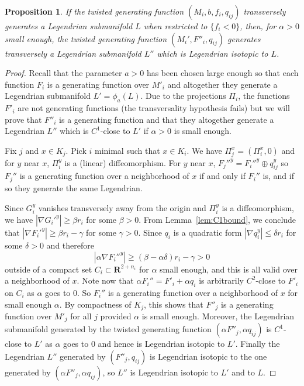 \documentclass[reqno]{amsart}
\theoremstyle{theorem}
\newtheorem{proposition}[corollary]{Proposition}
\theoremstyle{remark}
\theoremstyle{definition}
\newcommand{\R}{\mathbf{R}}
\begin{document}
\begin{proposition}
If the twisted generating function $(M_i,b,f_i,q_{ij})$ transversely generates a Legendrian submanifold $L$ when restricted to $\{f_i<0\}$,
then, for $\alpha>0$ small enough, the twisted generating function $(M_i',F''_i, q_{ij})$ generates transversely a Legendrian submanifold $L''$
which is Legendrian isotopic to $L$.
\end{proposition}
\begin{proof}
Recall that the parameter $a>0$ has been chosen large enough so that each function $F_i$ is a generating
function over $M'_i$ and altogether they generate a Legendrian submanifold $L'=\phi_a(L)$.
Due to the projections $\Pi_i$, the functions $F'_i$ are not generating functions (the transversality hypothesis fails)
but we will prove that $F''_i$ is a generating function and that they altogether generate a Legendrian $L''$
which is $C^1$-close to $L'$ if $\alpha>0$ is small enough.


Fix $j$ and $x\in K_j$. Pick $i$ minimal such that $x\in K_i$. We have $\Pi_j^x=(\Pi_i^x,0)$
and for $y$ near $x$, $\Pi_i^y$ is a (linear) diffeomorphism.
For $y$ near $x$, $F_j''^y=F_i''^y\oplus q^y_{ij}$ so $F_j''$ is a generating function
over a neighborhood of $x$ if and only if $F_i''$ is, and if so they generate the same Legendrian.


Since $G^y_i$ vanishes transversely away from the origin and $\Pi_i^y$ is a diffeomorphism, we have $|\nabla G_i'^y|\geq \beta r_i$ for some $\beta >0$.
From Lemma~\ref{lem:C1bound}, we conclude that $|\nabla F_i'^y|\geq \beta r_i - \gamma$ for some $\gamma >0$.
Since $q_i$ is a quadratic form $|\nabla q^y_i| \leq \delta r_i$ for some $\delta>0$ and therefore 
\[|\alpha\nabla F_i''^y|\geq (\beta -\alpha \delta) r_i - \gamma>0\]
outside of a compact set $C_i\subset \R^{2+n_i}$ for $\alpha$ small enough, and this is all valid over
a neighborhood of $x$. 
Note now that $\alpha F_i''=F'_i+ \alpha q_i$ is arbitrarily $C^2$-close to $F'_i$
on $C_i$ as $\alpha$ goes to $0$. So $F_i''$ is a generating function over a neighborhood of $x$ for small enough $\alpha$.
By compactness of $K_j$, this shows that $F''_j$ is a generating function over $M'_j$
for all $j$ provided $\alpha$ is small enough. Moreover, the Legendrian submanifold generated by the twisted generating function
$(\alpha F''_j, \alpha q_{ij})$ is $C^1$-close to $L'$ as $\alpha$ goes to $0$ and hence is Legendrian isotopic
to $L'$. Finally the Legendrian $L''$ generated by $(F''_j,q_{ij})$ is Legendrian isotopic to the one generated by $(\alpha F''_j,\alpha q_{ij})$,
so $L''$ is Legendrian isotopic to $L'$ and to $L$.
\end{proof}
\end{document}
